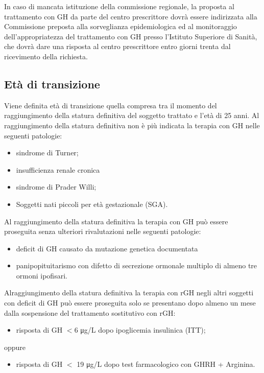 In caso di mancata istituzione della commissione regionale, la proposta al trattamento con GH da parte del
centro prescrittore dovr\`a essere indirizzata alla Commissione preposta alla sorveglianza epidemiologica ed al
monitoraggio dell'appropriatezza del trattamento con GH presso l'Istituto Superiore di Sanit\`a, che dovr\`a dare
una risposta al centro prescrittore entro giorni trenta dal ricevimento della richiesta.

\subsection*{Et\`a di transizione}

Viene definita et\`a di transizione quella compresa tra il momento del raggiungimento della statura definitiva del
soggetto trattato e l'et\`a di 25 anni.
Al raggiungimento della statura definitiva non \`e più indicata la terapia con GH nelle seguenti patologie:
\begin{itemize}
\item sindrome di Turner;
\item insufficienza renale cronica
\item sindrome di Prader Willi;
\item Soggetti nati piccoli per et\`a gestazionale (SGA).
\end{itemize}

Al raggiungimento della statura definitiva la terapia con GH può essere proseguita senza ulteriori rivalutazioni
nelle seguenti patologie:
\begin{itemize}
\item deficit di GH causato da mutazione genetica documentata
\item panipopituitarismo con difetto di secrezione ormonale multiplo di almeno tre ormoni ipofisari.
\end{itemize}

Alraggiungimento della statura definitiva la terapia con rGH negli altri soggetti con deficit di GH può essere
proseguita solo se presentano dopo almeno un mese dalla sospensione del trattamento sostitutivo con rGH:
\begin{itemize}
\item risposta di GH $<$6 \unit{\micro g}/L dopo ipoglicemia insulinica (ITT);
\end{itemize}
oppure
\begin{itemize}
\item risposta di GH $<$ 19 \unit{\micro g}/L dopo test farmacologico con GHRH + Arginina.
\end{itemize}

